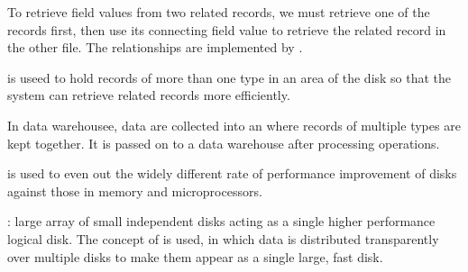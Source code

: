     \par To retrieve field values from two related records, we must retrieve one of the records first, then use its connecting field value to retrieve the related record in the other file. The relationships are implemented by .
    \par {} is useed to hold records of more than one type in an area of the disk so that the system can retrieve related records more efficiently.
    \par In data warehousee, data are collected into an  where records of multiple types are kept together. It is passed on to a data warehouse after  processing operations.


  \par {} is used to even out the widely different rate of performance improvement of disks against those in memory and microprocessors.
  \par {}: large array of small independent disks acting as a single higher performance logical disk. The concept of  is used, in which data is distributed transparently over multiple disks to make them appear as a single large, fast disk.
